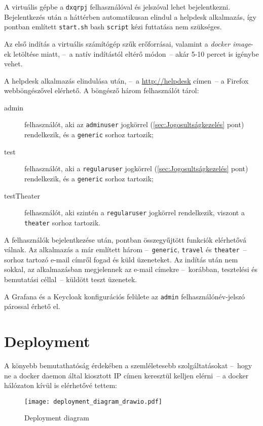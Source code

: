 A virtuális gépbe a \texttt{dxqrpj} felhasználóval és jelszóval lehet bejelentkezni. Bejelentkezés után a háttérben automatikusan elindul a helpdesk alkalmazás, így  pontban említett \texttt{start.sh} bash \texttt{script} kézi futtatása nem szükséges.

Az első indítás a virtuális számítógép szűk erőforrásai, valamint a \emph{docker image}-ek letöltése miatt, --~a natív indítástól eltérő módon~-- akár 5-10 percet is igénybe vehet.

A helpdesk alkalmazás elindulása után, --~a \href{http://helpdesk}{http://helpdesk} címen~-- a Firefox webböngészővel elérhető. A böngésző három felhasználót tárol:
\begin{description}
	\item[admin] felhasználót, aki az \texttt{admin\textunderscore user} jogkörrel (\ref{sec:Jogosultságkezelés} pont) rendelkezik, és a \texttt{generic} sorhoz tartozik;
	\item[test] felhasználót, aki a \texttt{regular\textunderscore user} jogkörrel (\ref{sec:Jogosultságkezelés} pont) rendelkezik, és a \texttt{generic} sorhoz tartozik;
	\item[testTheater] felhasználót, aki szintén a \texttt{regular\textunderscore user} jogkörrel rendelkezik, viszont a \texttt{theater} sorhoz tartozik.
\end{description}
 
A felhasználók bejelentkezése után,  pontban összegyűjtött funkciók elérhetővá válnak. Az alkalmazás a már említett három --~\texttt{generic}, \texttt{travel} és \texttt{theater}~-- sorhoz tartozó e-mail címről fogad és küld üzeneteket. Az indítás után nem sokkal, az alkalmazásban megjelennek az e-mail címekre --~korábban, tesztelési és bemutatási céllal~-- küldött teszt üzenetek.

A Grafana és a Keycloak konfigurációs felülete az \texttt{admin} felhasználónév-jelszó párossal érhető el.

\section{Deployment}
A könyebb bemutathatóság érdekében a szemléletesebb szolgáltatásokat --~hogy ne a docker daemon által kiosztott IP címen keresztül kelljen elérni~-- a docker hálózaton kívül is elérhetővé tettem:



\begin{figure}[hbt] 
	\centering
	\texttt{[image: deployment\_diagram\_drawio.pdf]}
	\caption[Deployment diagram]{Deployment diagram}
	\label{fig:deployment_diagram}
\end{figure}


